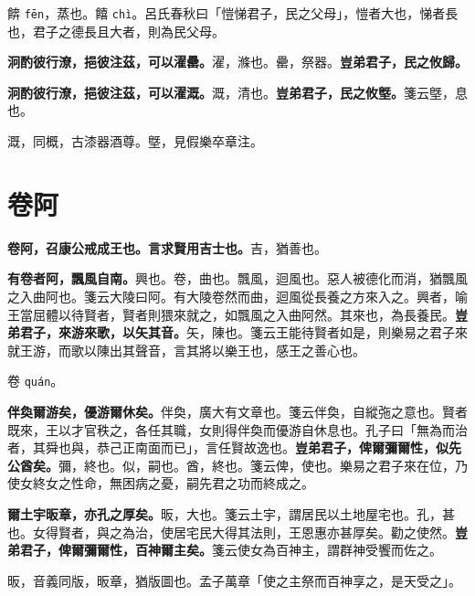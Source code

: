 \begin{quoting}餴 \texttt{fēn}，蒸也。饎 \texttt{chì}。呂氏春秋曰「愷悌君子，民之父母」，愷者大也，悌者長也，君子之德長且大者，則為民父母。\end{quoting}

\textbf{泂酌彼行潦，挹彼注茲，可以濯罍。}{\footnotesize 濯，滌也。罍，祭器。}\textbf{豈弟君子，民之攸歸。}

\textbf{泂酌彼行潦，挹彼注茲，可以濯溉。}{\footnotesize 溉，清也。}\textbf{豈弟君子，民之攸墍。}{\footnotesize 箋云墍，息也。}

\begin{quoting}溉，同概，古漆器酒尊。墍，見假樂卒章注。\end{quoting}

\section{卷阿}


\textbf{卷阿，召康公戒成王也。言求賢用吉士也。}{\footnotesize 吉，猶善也。}

\textbf{有卷者阿，飄風自南。}{\footnotesize 興也。卷，曲也。飄風，迴風也。惡人被德化而消，猶飄風之入曲阿也。箋云大陵曰阿。有大陵卷然而曲，迴風從長養之方來入之。興者，喻王當屈體以待賢者，賢者則猥來就之，如飄風之入曲阿然。其來也，為長養民。}\textbf{豈弟君子，來游來歌，以矢其音。}{\footnotesize 矢，陳也。箋云王能待賢者如是，則樂易之君子來就王游，而歌以陳出其聲音，言其將以樂王也，感王之善心也。}

\begin{quoting}卷 \texttt{quán}。\end{quoting}

\textbf{伴奐爾游矣，優游爾休矣。}{\footnotesize 伴奐，廣大有文章也。箋云伴奐，自縱㢮之意也。賢者既來，王以才官秩之，各任其職，女則得伴奐而優游自休息也。孔子曰「無為而治者，其舜也與，恭己正南面而已」，言任賢故逸也。}\textbf{豈弟君子，俾爾彌爾性，似先公酋矣。}{\footnotesize 彌，終也。似，嗣也。酋，終也。箋云俾，使也。樂易之君子來在位，乃使女終女之性命，無困病之憂，嗣先君之功而終成之。}

\textbf{爾土宇昄章，亦孔之厚矣。}{\footnotesize 昄，大也。箋云土宇，謂居民以土地屋宅也。孔，甚也。女得賢者，與之為治，使居宅民大得其法則，王恩惠亦甚厚矣。勸之使然。}\textbf{豈弟君子，俾爾彌爾性，百神爾主矣。}{\footnotesize 箋云使女為百神主，謂群神受饗而佐之。}

\begin{quoting}昄，音義同版，昄章，猶版圖也。孟子萬章「使之主祭而百神享之，是天受之」。\end{quoting}

